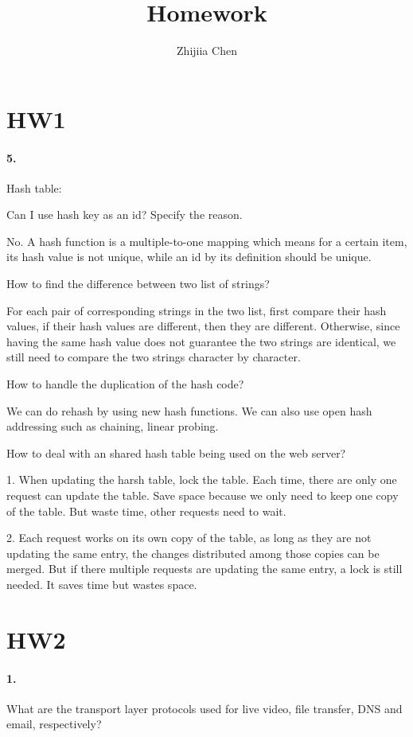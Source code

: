 \documentclass{article}
\title{Homework}
\author{Zhijiia Chen}
\begin{document}
\maketitle

\section{HW1}
\paragraph{5.} Hash table:

Can I use hash key as an id? Specify the reason.

No. A hash function is a multiple-to-one mapping which means for a certain item, its hash value is not unique, while an id by its definition should be unique.

How to find the difference between two list of strings?

For each pair of corresponding strings in the two list, first compare their hash values, if their hash values are different, then they are different. Otherwise, since having the same hash value does not guarantee the two strings are identical, we still need to compare the two strings character by character.

How to handle the duplication of the hash code?

We can do rehash by using new hash functions. We can also use open hash addressing such as chaining, linear probing.

How to deal with an shared hash table being used on the web server?

1. When updating the harsh table, lock the table. Each time, there are only one request can update the table. Save space because we only need to keep one copy of the table. But waste time, other requests need to wait.

2. Each request works on its own copy of the table, as long as they are not updating the same entry, the changes distributed among those copies can be merged. But if there multiple requests are updating the same entry, a lock is still needed. It saves time but wastes space.

\section{HW2}

\paragraph{1.} What are the transport layer protocols used for live video, ﬁle transfer, DNS and email, respectively?
\end{document}
